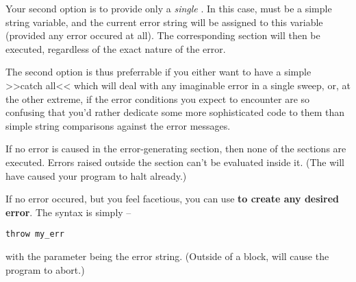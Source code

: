 Your second option is to provide only a \emph{single} . In
this case,  must be a simple string variable, and the current
error string will be assigned to this variable (provided any error
occured at all). The corresponding  section will then be
executed, regardless of the exact nature of the error.

The second option is thus preferrable if you either want to have a
simple >>catch all<< which will deal with any imaginable error in a
single sweep, or, at the other extreme, if the error conditions you
expect to encounter are so confusing that you'd rather dedicate some
more sophisticated code to them than simple string comparisons against
the error messages.

If no error is caused in the error-generating section, then none of the
 sections are executed. Errors raised outside the  section can't be evaluated inside it. (The will have
caused your program to halt already.)

If no error
occured, but you feel facetious, you can use \textbf{ to
create any desired error}. The syntax is simply -- 

\begin{lstlisting}
throw my_err
\end{lstlisting}

with the parameter  being the error string. (Outside of a
 block,  will cause the program to
abort.)
